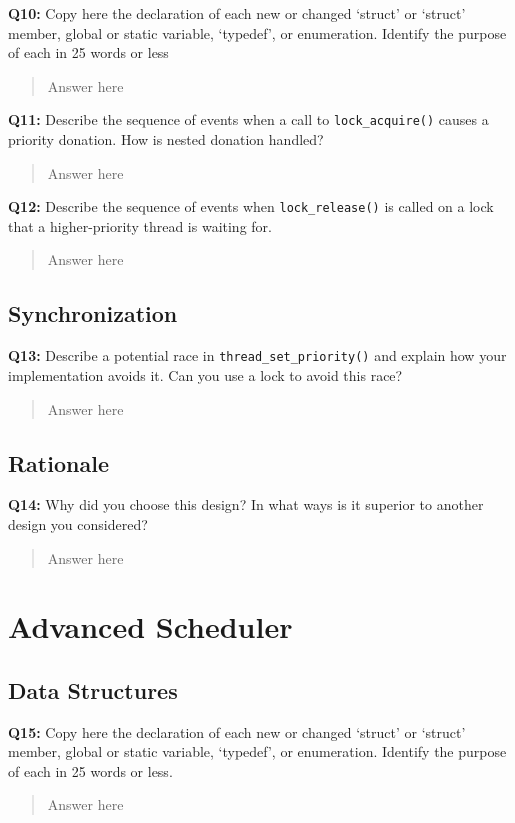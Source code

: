 \documentclass[a4paper,11pt]{paper}
\begin{document}
\textbf{Q10:} Copy here the declaration of each new or changed `struct' or `struct' member, global or static variable, `typedef', or enumeration.  Identify the purpose of each in 25 words or less
\begin{quote}
  Answer here
\end{quote}

\textbf{Q11:} Describe the sequence of events when a call to \texttt{lock\_acquire()} causes a priority donation.  How is nested donation handled?
\begin{quote}
  Answer here
\end{quote}

\textbf{Q12:} Describe the sequence of events when \texttt{lock\_release()} is called on a lock that a higher-priority thread is waiting for.
\begin{quote}
  Answer here
\end{quote}

\subsection{Synchronization}
 
\textbf{Q13:} Describe a potential race in \texttt{thread\_set\_priority()} and explain how your implementation avoids it. Can you use a lock to avoid this race?
\begin{quote}
  Answer here
\end{quote}

\subsection{Rationale}

\textbf{Q14:} Why did you choose this design?  In what ways is it superior to another design you considered?
\begin{quote}
  Answer here
\end{quote}

\section{Advanced Scheduler}

\subsection{Data Structures}

\textbf{Q15:} Copy here the declaration of each new or changed `struct' or `struct' member, global or static variable, `typedef', or enumeration.  Identify the purpose of each in 25 words or less.
\begin{quote}
  Answer here
\end{quote}
\end{document}
